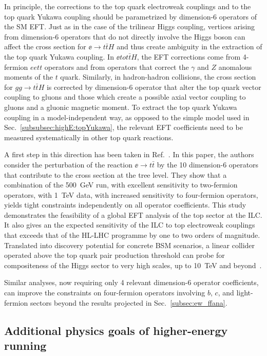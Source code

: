 In principle, the corrections to the top quark electroweak couplings
and to the top quark Yukawa coupling should be parametrized by
dimension-6 operators of the SM EFT.   Just as in the case of the
trilinear Higgs coupling, vertices arising from dimension-6 operators
that do not directly involve the Higgs boson can affect the cross
section for $\ee\to t\bar t H$ and thus create ambiguity in the
extraction of the top quark Yukawa coupling.   In $\ee to t\bar t H$,
the EFT corrections come from 4-fermion $eett$ operators and from
operators that correct the $\gamma$ and $Z$ anomalous moments of the
$t$ quark.   Similarly, in hadron-hadron collisions, the cross section
for $gg\to t\bar t H$ is corrected by dimension-6 operator that alter
the top quark vector coupling to gluons and those which create a
possible axial vector coupling to gluons and a gluonic magnetic
moment.  To extract the top quark Yukawa coupling in a
model-independent way, as opposed to the simple model used in
Sec.~\ref{subsubsec:highE:topYukawa}, the relevant EFT coefficients
need to be measured systematically in other top quark reactions.

A first step in this direction has been taken in
Ref.~\cite{Durieux:2018tev}.   In this paper, the authors consider the
perturbation of the reaction $\ee\to t\bar t$ by the 10 dimension-6
operators that contribute to the cross section at the tree level.
They show that a 
combination of
 the 500~GeV run, with excellent sensitivity to two-fermion operators,
with 1~TeV{} data, with increased sensitivity to four-fermion
operators, yields  tight constraints independently on 
all operator coefficients.  This study demonstrates the feasibility of a global EFT analysis of the top sector
at the ILC.  It also gives an the expected sensitivity of the ILC to
top electroweak couplings that  exceeds that of the HL-LHC programme by one to two orders of
magnitude. Translated into discovery potential for concrete BSM scenarios, a linear collider operated above the top quark
pair production threshold can probe for compositeness of the Higgs
sector to very high scales, up to 10~TeV and
beyond~\cite{Durieux:2018ekg}. 


Similar analyses, now requiring  only 4 relevant dimension-6 operator coefficients, can
improve the constraints on four-fermion operators involving $b$, $c$,
and light-fermion sectors beyond the results projected in
Sec.~\ref{subsec:ew_ffana}.

\subsection{Additional  physics goals of higher-energy running}

